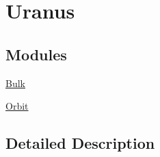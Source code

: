 \hypertarget{group___e_g_x_phys-_constants-_astrophysics-_solar_system-_uranus}{}\section{Uranus}
\label{group___e_g_x_phys-_constants-_astrophysics-_solar_system-_uranus}
\subsection*{Modules}
\begin{DoxyCompactItemize}
\item 
\mbox{\hyperlink{group___e_g_x_phys-_constants-_astrophysics-_solar_system-_uranus-_bulk}{Bulk}}
\item 
\mbox{\hyperlink{group___e_g_x_phys-_constants-_astrophysics-_solar_system-_uranus-_orbit}{Orbit}}
\end{DoxyCompactItemize}


\subsection{Detailed Description}
